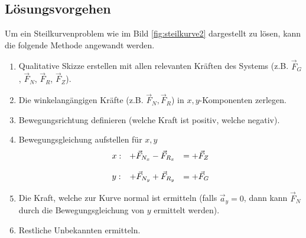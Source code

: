 \subsection{Lösungsvorgehen}
Um ein Steilkurvenproblem wie im Bild \ref{fig:steilkurve2} dargestellt
zu lösen, kann die folgende Methode angewandt werden.

\begin{enumerate}
	\item Qualitative Skizze erstellen mit allen relevanten Kräften
		des Systems (z.B. $\vec{F}_G$, $\vec{F}_N$, $\vec{F}_R$, 
		$\vec{F}_Z$).
	\item Die winkelangängigen Kräfte (z.B. $\vec{F}_N, \vec{F}_R$) 
		in $x,y$-Komponenten zerlegen.
	\item Bewegungsrichtung definieren (welche Kraft ist positiv, 
		welche negativ).
	\item Bewegungsgleichung aufstellen für $x,y$
\[\begin{array}{l r l}
	x: &
		+ \vec{F}_{N_x} - \vec{F}_{R_x} & = + \vec{F}_Z \\
	 & & \\
	y: &
		+ \vec{F}_{N_y} + \vec{F}_{R_y} & = + \vec{F}_G
\end{array} \]

	\item Die Kraft, welche zur Kurve normal ist ermitteln (falls
		$\vec{a}_y=0$, dann kann $\vec{F}_N$ durch die
		Bewegungsgleichung von $y$ ermittelt werden).
	\item Restliche Unbekannten ermitteln.
\end{enumerate}
